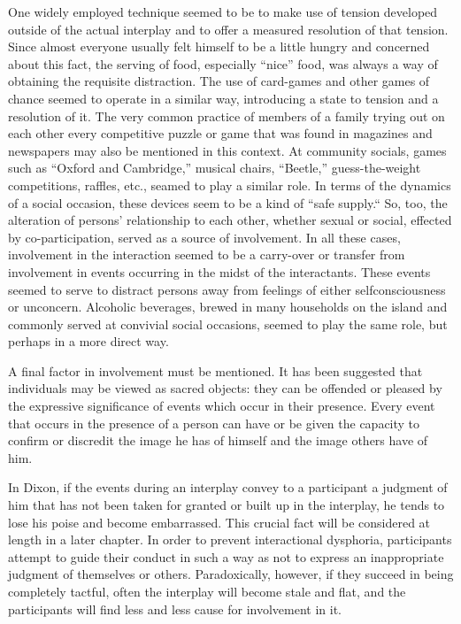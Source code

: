 \documentclass[openany,nobib]{tufte-book}
\begin{document}
One widely employed technique seemed to be to make use of tension
developed outside of the actual interplay and to offer a measured
resolution of that tension. Since almost everyone usually felt himself
to be a little hungry and concerned about this fact, the serving of
food, especially ``nice'' food, was always a way of obtaining the
requisite distraction. The use of card-games and other games of chance
seemed to operate in a similar way, introducing a state to tension and a
resolution of it. The very common practice of members of a family trying
out on each other every competitive puzzle or game that was found in
magazines and newspapers may also be mentioned in this context. At
community socials, games such as ``Oxford and Cambridge,'' musical
chairs, ``Beetle,'' guess-the-weight competitions, raffles, etc., seamed
to play a similar role. In terms of the dynamics of a social occasion,
these devices seem to be a kind of ``safe supply.`` So, too, the
alteration of persons' relationship to each other, whether sexual or
social, effected by co-participation, served as a source of involvement.
In all these cases, involvement in the interaction seemed to be a
carry-over or transfer from involvement in events occurring in the midst
of the interactants. These events seemed to serve to distract persons
away from feelings of either selfconsciousness or unconcern. Alcoholic
beverages, brewed in many households on the island and commonly served
at convivial social occasions, seemed to play the same role, but perhaps
in a more direct way.

A final factor in involvement must be mentioned. It has been suggested
that individuals may be viewed as sacred objects: they can be offended
or pleased by the expressive significance of events which occur in their
presence. Every event that occurs in the presence of a person can have
or be given the capacity to confirm or discredit the image he has of
himself and the image others have of him.

In Dixon, if the events during an interplay convey to a participant a
judgment of him that has not been taken for granted or built up in the
interplay, he tends to lose his poise and become embarrassed. This
crucial fact will be considered at length in a later chapter. In order
to prevent interactional dysphoria, participants attempt to guide their
conduct in such a way as not to express an inappropriate judgment of
themselves or others. Paradoxically, however, if they succeed in being
completely tactful, often the interplay will become stale and flat, and
the participants will find less and less cause for involvement in it.
\end{document}
